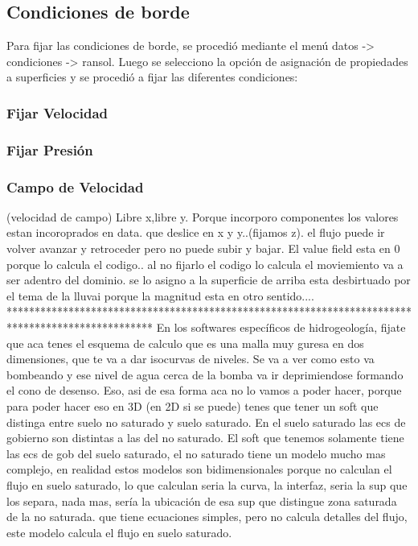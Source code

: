 \documentclass[10pt,a4paper,final]{article}
\begin{document}
%
\subsection{Condiciones de borde}
Para fijar las condiciones de borde, se procedió mediante el menú datos -> condiciones -> ransol. Luego se selecciono la opción de asignación de propiedades a superficies y se procedió a fijar las diferentes condiciones:
\subsubsection*{Fijar Velocidad}

\subsubsection*{Fijar Presión}

\subsubsection*{Campo de Velocidad}

(velocidad de campo) Libre x,libre y. Porque incorporo componentes los valores estan incoroprados en data.
que deslice en x y y..(fijamos z).
el flujo puede ir volver avanzar y retroceder pero no puede subir y bajar. El value field esta en 0 porque lo calcula el codigo.. al no fijarlo el codigo lo calcula
el moviemiento va a ser adentro del dominio. se lo asigno  a la superficie de arriba
esta desbirtuado por el tema de la lluvai porque la magnitud esta en otro sentido....
**************************************************************************************************
En los softwares específicos de hidrogeología, fijate que aca tenes el esquema de calculo que es una malla muy guresa en dos dimensiones, que te va a dar isocurvas de niveles. Se va a ver como esto va bombeando y ese nivel de agua cerca de la bomba va ir deprimiendose formando el cono de desenso. Eso, asi de esa forma aca no lo vamos a poder hacer, porque para poder hacer eso en 3D (en 2D si se puede) tenes que tener un soft que distinga entre suelo no saturado y suelo saturado. En el suelo saturado las ecs de gobierno son distintas a las del no saturado. El soft que tenemos solamente tiene las ecs de gob del suelo saturado, el no saturado tiene un modelo mucho mas complejo, en realidad estos modelos son bidimensionales porque no calculan el flujo en suelo saturado, lo que calculan seria la curva, la interfaz, seria la sup que los separa, nada mas, sería la ubicación de esa sup que distingue zona saturada de la no saturada. que tiene ecuaciones simples, pero no calcula detalles del flujo, este modelo calcula el flujo en suelo saturado. 
\end{document}
